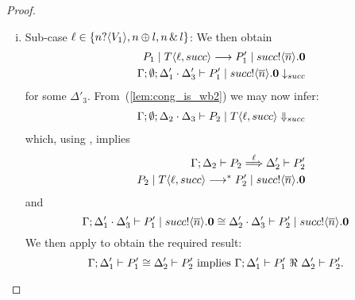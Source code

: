 \begin{proof}
\begin{enumerate}[1.]
			\begin{enumerate}[i.]
				\item	Sub-case $\ell \in \{n ? \langle V_1 \rangle, n \oplus l, n \,\&\, l\}$:  
				We then obtain
						\begin{eqnarray*}
							&& P_1 \;|\; T\langle \ell, succ \rangle \longrightarrow P_1' \;|\; succ ! \langle \overline{n} \rangle . \mathbf{0} \\
							&& \Gamma; \emptyset; \Delta_1' \cdot \Delta_3' \vdash P_1' \;|\; succ ! \langle \overline{n} \rangle . \mathbf{0} \downarrow_{succ}
						\end{eqnarray*}
						for some $\Delta'_3$. From~(\ref{lem:cong_is_wb2}) we may now infer:
						\begin{eqnarray*}
							&& \Gamma; \emptyset; \Delta_2 \cdot \Delta_3 \vdash P_2 \;|\; T\langle \ell, succ \rangle \Downarrow_{succ}
						\end{eqnarray*}
						which, using , implies
						\begin{eqnarray*}
							&& \Gamma; \Delta_2 \vdash P_2 \stackrel{\ell}{\Longrightarrow} \Delta_2' \vdash P_2'\\
							&& P_2 \;|\; T \langle \ell, succ \rangle \longrightarrow^{*} P_2' \;|\; succ ! \langle \overline{n} \rangle . \mathbf{0}
						\end{eqnarray*}
						\noi and
						\[
							\Gamma; \Delta_1' \cdot \Delta_3' \vdash P_1' \;|\; succ ! \langle \overline{n} \rangle .\mathbf{0} \cong \Delta_2' \cdot \Delta_3' \vdash P_2' \;|\; succ ! \langle \overline{n} \rangle . \mathbf{0}
						\]
						We then apply  to obtain the required result:
						\[
							\horel{\Gamma}{\Delta_1'}{P_1'}{\cong}{\Delta_2'}{P_2'} \text{ implies } \horel{\Gamma}{\Delta_1'}{P_1'}{\ \Re\ }{\Delta_2'}{P_2'}.
						\]


\end{enumerate}
\end{enumerate}
\end{proof}
